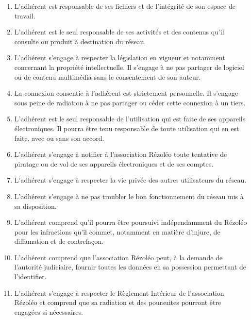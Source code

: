 \documentclass[12pt]{article}
\begin{document}
\begin{enumerate}
\item L'adhérent est responsable de ses fichiers et de l'intégrité de son espace de travail.
\item L'adhérent est le seul responsable de ses activités et des contenus qu'il consulte ou produit à destination du réseau.
\item L'adhérent s'engage à respecter la législation en vigueur et notamment concernant la propriété intellectuelle. Il s'engage à ne pas partager de logiciel ou de contenu multimédia sans le consentement de son auteur.

\item La connexion consentie à l'adhérent est strictement personnelle. Il s'engage sous peine de radiation à ne pas partager ou céder cette connexion à un tiers.

\item L'adhérent est le seul responsable de l'utilisation qui est faite de ses appareils électroniques. Il pourra être tenu responsable de toute utilisation qui en est faite, avec ou sans son accord.

\item L'adhérent s'engage à notifier à l'association Rézoléo toute tentative de piratage ou de vol de ses appareils électroniques et de ses comptes.

\item L'adhérent s'engage à respecter la vie privée des autres utilisateurs du réseau.

\item L'adhérent s'engage à ne pas troubler le bon fonctionnement du réseau mis à sa disposition.

\item L'adhérent comprend qu'il pourra être poursuivi indépendamment du Rézoléo pour les infractions qu'il commet, notamment en matière d'injure, de diffamation et de contrefaçon.

\item L'adhérent comprend que l'association Rézoléo peut, à la demande de l'autorité judiciaire, fournir toutes les données en sa possession permettant de l'identifier.

\item L'adhérent s'engage à respecter le Règlement Intérieur de l'association Rézoléo et comprend
que sa radiation et des poursuites pourront être engagées si nécessaires.

%

\end{enumerate}
\end{document}
